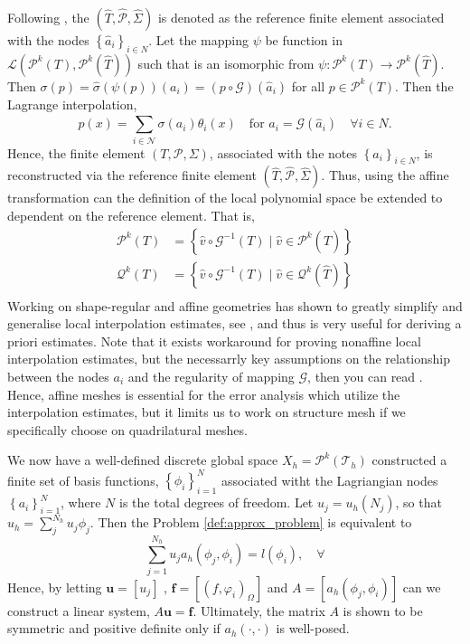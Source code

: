 Following \cite[Example 9.4]{ErnGuermond2021}, the $ ( \hat{T}, \hat{\mathcal{P} }, \hat{\Sigma} ) $ is denoted as the reference finite element associated with the nodes $\left\{ \hat{a}_{i} \right\}_{i\in N} $. Let the mapping $\psi $ be function in $\mathcal{L}( \mathcal{P} ^{k}( T), \mathcal{P} ^{k}(\hat{T}
)  )  $ such that is an isomorphic from  $ \psi : \mathcal{P} ^{k}( T) \to \mathcal{P} ^{k}( \hat{T})   $.  Then $\sigma ( p) = \hat{\sigma }( \psi ( p) ) (a_{i} )  = ( p \circ \mathcal{G} )( \hat{a}_{i})      $ for all $p \in \mathcal{P}^{k}( T)  $.
Then the Lagrange interpolation,  \[
    p (x) = \sum_{i \in \mathcal{N} }^{} \sigma ( a_{i}) \theta_{i}( x) \quad \text{for } a_{i} = \mathcal{G}( \hat{a}_{i}) \quad  \forall i \in N     .
\]
Hence, the finite element $( T, \mathcal{P}, \Sigma  ) $, associated with the notes $\left\{ a_{i} \right\}_{i\in N} $, is reconstructed via the reference finite element $( \hat{T}, \hat{\mathcal{P} }, \hat{\Sigma} ) $.
Thus, using the affine transformation can the definition of the local polynomial space be extended to dependent on the reference element. That is, \[
    \begin{split}
\mathcal{P}^{k}( T) & = \left\{ \hat{v} \circ  \mathcal{G}^{-1}( T)   \mid  \hat{v} \in \mathcal{P}^{k}( \hat{T})      \right\} \\
\mathcal{Q}^{k}( T) & = \left\{ \hat{v} \circ  \mathcal{G}^{-1}( T)     \mid  \hat{v} \in \mathcal{Q}^{k}( \hat{T})      \right\} \\
    \end{split}
\]
Working on shape-regular and affine geometries has shown to greatly simplify and generalise local interpolation estimates, see \cite[Theorem 11.12]{ErnGuermond2021}, and thus is very useful for deriving a priori estimates. Note that it exists
workaround for proving nonaffine local interpolation estimates, but the necessarrly key assumptions on the relationship between the nodes $a_{i}$ and the regularity of mapping $\mathcal{G} $, then you can read \cite[Chapter 13]{ErnGuermond2021}.
Hence, affine meshes is essential for the error analysis which utilize the interpolation estimates, but it limits us to work on structure mesh if we specifically choose on quadrilatural meshes.

We now have a well-defined discrete global space  $X_{h} = \mathcal{P}^{k}( \mathcal{T}_{h} )   $ constructed a finite set of basis functions, $\left\{ \phi _{i} \right\}_{i=1}^{N} $ associated witht the Lagriangian nodes $\left\{ a_{i} \right\}_{i=1}^{N}  $,
where $N$ is the total degrees of freedom. Let $u_{j} = u_{h}\left( N_{j} \right) $, so that $u_{h} = \sum_{j}^{N_{h}} u_{j} \phi _{j}  $. Then the Problem \ref{def:approx_problem} is equivalent to
 \[
\sum_{j = 1}^{N_{h}} u_{j} a_{h}\left( \phi _{j}, \phi _{i} \right)  = l\left( \phi _{i} \right), \quad \forall
\]
Hence, by letting $\mathbf{u} = \left[ u_{j} \right] $ , $\mathbf{f} = \left[ \left( f, \varphi _{i}  \right) _{\Omega } \right] $  and $A = \left[ a_{h}\left( \phi _{j}, \phi _{i} \right)  \right] $ can we construct a linear system, \( A
\mathbf{u} =\mathbf{f} \).
Ultimately, the matrix $A$ is shown to be symmetric and positive definite only if $a_{h}( \cdot ,\cdot ) $ is well-posed.

